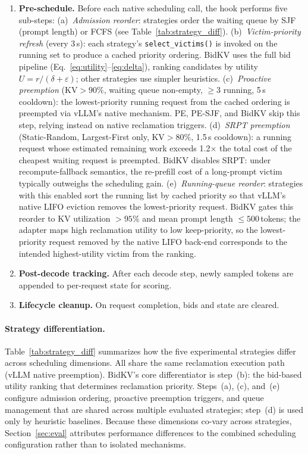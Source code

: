 \documentclass[sigconf,nonacm]{acmart}
\newcommand{\bidkv}{BidKV\xspace}
\newcommand{\utilfn}{\ensuremath{U}}
\newcommand{\tokfree}{\ensuremath{r}}
\newcommand{\qualdelta}{\ensuremath{\delta}}
\newcommand{\stabeps}{\ensuremath{\varepsilon}}
\begin{document}
\begin{enumerate}[nosep]
\item \textbf{Pre-schedule.}  Before each native scheduling call, the hook
  performs five sub-steps:
  (a)~\emph{Admission reorder}: strategies order the waiting queue by SJF
  (prompt length) or FCFS (see Table~\ref{tab:strategy_diff}).
  (b)~\emph{Victim-priority refresh} (every 3\,s): each strategy's
  \texttt{select\_victims()} is invoked on the running set to produce a
  cached priority ordering.  BidKV uses the full bid pipeline
  (Eq.~\ref{eq:utility}--\ref{eq:delta}), ranking candidates by utility
  $\utilfn{=}\tokfree/(\qualdelta{+}\stabeps)$; other strategies use
  simpler heuristics.
  (c)~\emph{Proactive preemption} (KV${>}90\%$, waiting queue non-empty,
  ${\geq}3$ running, 5\,s cooldown): the lowest-priority running request
  from the cached ordering is preempted via vLLM's native mechanism.
  PE, PE-SJF, and \bidkv skip this step, relying instead on native reclamation triggers.
  (d)~\emph{SRPT preemption} (Static-Random, Largest-First only,
  KV${>}80\%$, 1.5\,s cooldown): a running request whose estimated
  remaining work exceeds 1.2$\times$ the total cost of the cheapest waiting
  request is preempted.  BidKV disables SRPT: under recompute-fallback
  semantics, the re-prefill cost of a long-prompt victim typically
  outweighs the scheduling gain.
  (e)~\emph{Running-queue reorder}: strategies with this enabled sort the
  running list by cached priority so that vLLM's native LIFO eviction
  removes the lowest-priority request.  BidKV gates this reorder to
  KV utilization ${>}95\%$ and mean prompt length ${\leq}500$\,tokens;
  the adapter maps high reclamation utility to low keep-priority, so the
  lowest-priority request removed by the native LIFO back-end corresponds
  to the intended highest-utility victim from the ranking.

\item \textbf{Post-decode tracking.}  After each decode step, newly sampled
  tokens are appended to per-request state for scoring.

\item \textbf{Lifecycle cleanup.}  On request completion, bids and state are
  cleared.
\end{enumerate}

\paragraph{Strategy differentiation.}
Table~\ref{tab:strategy_diff} summarizes how the five experimental strategies
differ across scheduling dimensions.  All share the same reclamation execution
path (vLLM native preemption).  \bidkv's core differentiator is
step~(b): the bid-based utility ranking that determines reclamation priority.
Steps~(a), (c), and~(e) configure admission ordering, proactive preemption
triggers, and queue management that are shared across multiple evaluated
strategies; step~(d) is used only by heuristic baselines.  Because these
dimensions co-vary across strategies, Section~\ref{sec:eval} attributes
performance differences to the combined scheduling configuration rather than
to isolated mechanisms.
\end{document}
